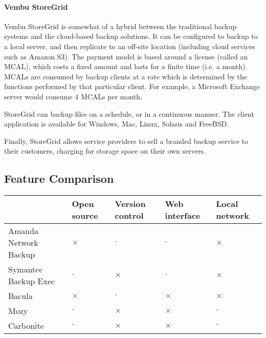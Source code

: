 \begin{bibunit}[plain]
\paragraph{Vembu StoreGrid}

Vembu StoreGrid is somewhat of a hybrid between the traditional backup systems
and the cloud-based backup solutions. It can be configured to backup to a local
server, and then replicate to an off-site location (including cloud services
such as Amazon S3). The payment model is based around a license (called an
MCAL), which costs a fixed amount and lasts for a finite time (i.e. a month).
MCALs are consumed by backup clients at a rate which is determined by the
functions performed by that particular client. For example, a Microsoft
Exchange server would consume 4 MCALs per month.

StoreGrid can backup files on a schedule, or in a continuous manner. The client
application is available for Windows, Mac, Linux, Solaris and FreeBSD.

Finally, StoreGrid allows service providers to sell a branded backup service to
their customers, charging for storage space on their own servers.

\subsection{Feature Comparison}

\begin{table}[H]
    \centering
    \begin{tabular}{ | l | p{1.5cm} | p{1.5cm} | p{1.5cm} | p{1.5cm} | }
        \hline
        & Open source   & Version control   & Web interface & Local network
            \\ \hline

        Amanda Network Backup   & $\times$  & $\cdot$   & $\cdot$   & $\times$
            \\ \hline

        Symantec Backup Exec    & $\cdot$   & $\times$  & $\cdot$   & $\times$
            \\ \hline

        Bacula                  & $\times$  & $\cdot$   & $\times$  & $\times$
            \\ \hline

        Mozy                    & $\cdot$   & $\times$  & $\times$  & $\cdot$
            \\ \hline

        Carbonite               & $\cdot$   & $\times$  & $\times$  & $\cdot$
            \\ \hline


\end{tabular}
\end{table}
\end{bibunit}
